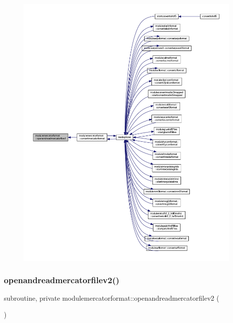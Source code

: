 \begin{figure}[H]
\begin{center}
\leavevmode
\includegraphics[width=350pt]{namespacemodulemercatorformat_a2cf596b9eace6fa889296e8e6079f834_icgraph}
\end{center}
\end{figure}
\mbox{\label{namespacemodulemercatorformat_ac844e04662b11a4b75858e60dcdd690a}} 
\subsubsection{\texorpdfstring{openandreadmercatorfilev2()}{openandreadmercatorfilev2()}}
{\footnotesize\ttfamily subroutine, private modulemercatorformat\+::openandreadmercatorfilev2 (\begin{DoxyParamCaption}{ }\end{DoxyParamCaption})\hspace{0.3cm}{\ttfamily [private]}}

